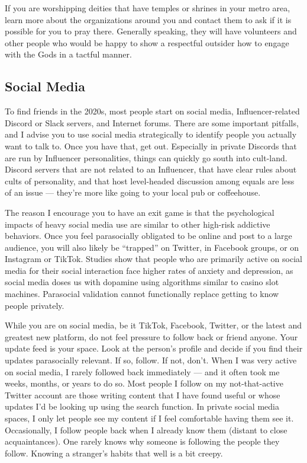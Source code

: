 \documentclass[
]{book}
\begin{document}
If you are worshipping deities that have temples or shrines in your metro area, learn more about the organizations around you and contact them to ask if it is possible for you to pray there. Generally speaking, they will have volunteers and other people who would be happy to show a respectful outsider how to engage with the Gods in a tactful manner.

\hypertarget{social-media}{%
\subsection{Social Media}\label{social-media}}

To find friends in the 2020s, most people start on social media, Influencer-related Discord or Slack servers, and Internet forums. There are some important pitfalls, and I advise you to use social media strategically to identify people you actually want to talk to. Once you have that, get out. Especially in private Discords that are run by Influencer personalities, things can quickly go south into cult-land. Discord servers that are not related to an Influencer, that have clear rules about cults of personality, and that host level-headed discussion among equals are less of an issue --- they're more like going to your local pub or coffeehouse.

The reason I encourage you to have an exit game is that the psychological impacts of heavy social media use are similar to other high-risk addictive behaviors. Once you feel parasocially obligated to be online and post to a large audience, you will also likely be ``trapped'' on Twitter, in Facebook groups, or on Instagram or TikTok. Studies show that people who are primarily active on social media for their social interaction face higher rates of anxiety and depression, as social media doses us with dopamine using algorithms similar to casino slot machines. Parasocial validation cannot functionally replace getting to know people privately.

While you are on social media, be it TikTok, Facebook, Twitter, or the latest and greatest new platform, do not feel pressure to follow back or friend anyone. Your update feed is your space. Look at the person's profile and decide if you find their updates parasocially relevant. If so, follow. If not, don't. When I was very active on social media, I rarely followed back immediately --- and it often took me weeks, months, or years to do so. Most people I follow on my not-that-active Twitter account are those writing content that I have found useful or whose updates I'd be looking up using the search function. In private social media spaces, I only let people see my content if I feel comfortable having them see it. Occasionally, I follow people back when I already know them (distant to close acquaintances). One rarely knows why someone is following the people they follow. Knowing a stranger's habits that well is a bit creepy.
\end{document}
